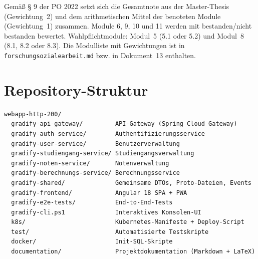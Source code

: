 \documentclass[12pt,a4paper,ngerman]{article}
\begin{document}
Gemäß § 9 der PO 2022 setzt sich die Gesamtnote aus der Master-Thesis (Gewichtung~2) und dem arithmetischen Mittel der benoteten Module (Gewichtung~1) zusammen. Module 6, 9, 10 und 11 werden mit \glqq bestanden/nicht bestanden\grqq{} bewertet. Wahlpflichtmodule: Modul~5 (5.1 oder 5.2) und Modul~8 (8.1, 8.2 oder 8.3). Die Modulliste mit Gewichtungen ist in \texttt{forschungsozialearbeit.md} bzw. in Dokument~13 enthalten.

\section{Repository-Struktur}

\begin{lstlisting}
webapp-http-200/
  gradify-api-gateway/         API-Gateway (Spring Cloud Gateway)
  gradify-auth-service/        Authentifizierungsservice
  gradify-user-service/        Benutzerverwaltung
  gradify-studiengang-service/ Studiengangsverwaltung
  gradify-noten-service/       Notenverwaltung
  gradify-berechnungs-service/ Berechnungsservice
  gradify-shared/              Gemeinsame DTOs, Proto-Dateien, Events
  gradify-frontend/            Angular 18 SPA + PWA
  gradify-e2e-tests/           End-to-End-Tests
  gradify-cli.ps1              Interaktives Konsolen-UI
  k8s/                         Kubernetes-Manifeste + Deploy-Script
  test/                        Automatisierte Testskripte
  docker/                      Init-SQL-Skripte
  documentation/               Projektdokumentation (Markdown + LaTeX)
\end{lstlisting}
\end{document}
